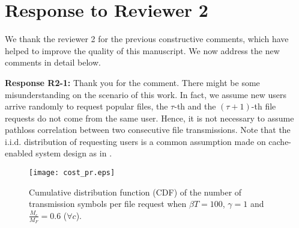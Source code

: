 \documentclass[12pt,onecolumn]{IEEEtran}
\newcommand{\blue}{\color{blue}}
\newcommand{\spaceblank}{\vskip 4mm}
\begin{document}
\spaceblank

\section{Response to Reviewer 2}

\spaceblank
{\blue
We thank the reviewer 2 for the previous constructive comments, which have helped to improve the quality of this manuscript. We now address the new comments in detail below.
}


\spaceblank
{}
\spaceblank	

{\blue \textbf{Response R2-1:} Thank you for the comment. There might be some misunderstanding on the scenario of this work. 
	In fact, we assume new users arrive randomly to request popular files, 
		the $\tau$-th and the $(\tau+1)$-th file requests do not come from
		the same user. Hence, it is not necessary to assume pathloss correlation between two consecutive file transmissions. 
		Note that the i.i.d. distribution of requesting users
		 is a common assumption made on cache-enabled system design as in \cite{Choi2016,Cui2016-TWC-july,Cui2017-TWC}.

}

	


\spaceblank


	 


\begin{figure}[tb]
	\centering
	\texttt{[image: cost\_pr.eps]} %
	\caption{Cumulative distribution function (CDF) of the number of transmission symbols per file request when $\beta T=100$, $\gamma=1$ and $\frac{M_c}{M_F}=0.6$ ($\forall c$).}
	\label{fig:delay}
\end{figure}
\end{document}
